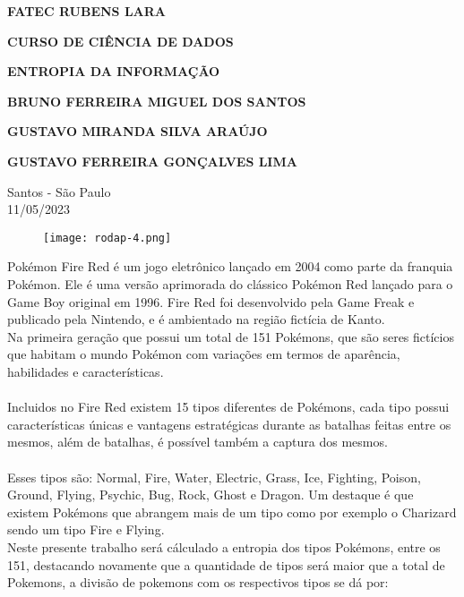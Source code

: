 \documentclass[a4paper,12pt]{article}
\begin{document}
\begin{center}
\textbf{FATEC RUBENS LARA}

\textbf{CURSO DE CIÊNCIA DE DADOS}

\vspace{3cm}

\textbf{ENTROPIA DA INFORMAÇÃO}

\vspace{3cm}

\textbf{BRUNO FERREIRA MIGUEL DOS SANTOS}

\textbf{GUSTAVO MIRANDA SILVA ARAÚJO}

\textbf{GUSTAVO FERREIRA GONÇALVES LIMA}

\vfill

\begin{flushright}
Santos - São Paulo\\
11/05/2023
\end{flushright}
\end{center}

\begin{figure}{}
\centering
\label{}
\texttt{[image: rodap-4.png]}
\end{figure}

\clearpage


Pokémon Fire Red é um jogo eletrônico lançado em 2004 como parte da franquia Pokémon. Ele é uma versão aprimorada do clássico Pokémon Red lançado para o Game Boy original em 1996. Fire Red foi desenvolvido pela Game Freak e publicado pela Nintendo, e é ambientado na região fictícia de Kanto.\\

Na primeira geração que possui um total de 151 Pokémons, que são seres fictícios que habitam o mundo Pokémon com variações em termos de aparência, habilidades e características. \\\\Incluidos no Fire Red existem 15 tipos diferentes de Pokémons, cada tipo possui características únicas e vantagens estratégicas durante as batalhas feitas entre os mesmos, além de batalhas, é possível também a captura dos mesmos.\\\\ Esses tipos são: Normal, Fire, Water, Electric, Grass, Ice, Fighting, Poison, Ground, Flying, Psychic, Bug, Rock, Ghost e Dragon. Um destaque é que existem Pokémons que abrangem mais de um tipo como por exemplo o Charizard sendo um tipo Fire e Flying.\\

Neste presente trabalho será cálculado a entropia dos tipos Pokémons, entre os 151, destacando novamente que a quantidade de tipos será maior que a total de Pokemons, a divisão de pokemons com os respectivos tipos se dá por:\\
\end{document}

